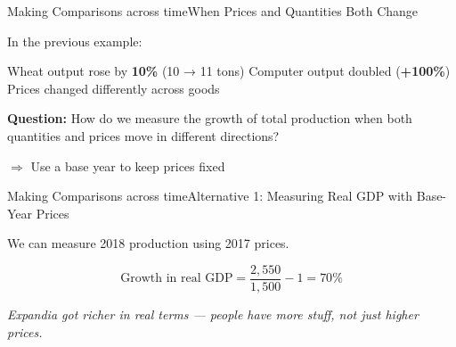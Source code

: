 \documentclass[10pt,aspectratio=169]{beamer}
\begin{document}
\begin{frame}{Making Comparisons across time}{When Prices and Quantities Both Change}

In the previous example:
\begin{itemize}
\itemvso Wheat output rose by \textbf{10\%} (10 → 11 tons)
\itemvso Computer output doubled (\textbf{+100\%})
\itemvso Prices changed differently across goods
\end{itemize}
\vspace{0.3cm}
\textbf{Question:}  
How do we measure the growth of total production when both quantities and prices move in different directions?

\begin{itemize}
\itemvso[]$\Rightarrow$ Use a base year to keep prices fixed
\end{itemize}

\end{frame}

\begin{frame}{Making Comparisons across time}{Alternative 1: Measuring Real GDP with Base-Year Prices}

We can measure 2018 production using 2017 prices.

\begin{table}
\end{table}


\[
\text{Growth in real GDP} = \frac{2,550}{1,500} - 1 = 70\%
\]

\begin{center}
\textit{Expandia got richer in real terms — people have more stuff, not just higher prices.}
\end{center}

\end{frame}
\end{document}
